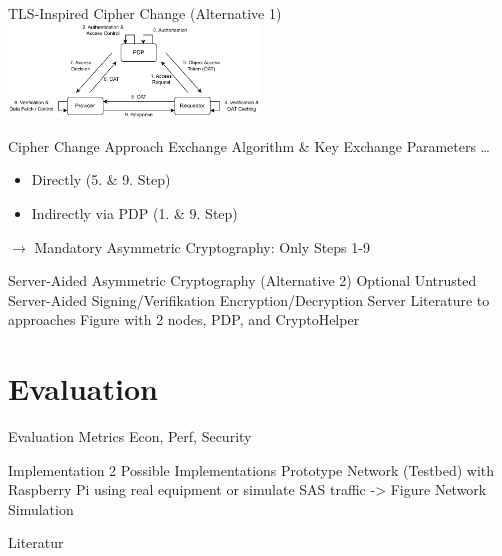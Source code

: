 \documentclass[en]{sdqbeamer}
\begin{document}
\begin{frame}{TLS-Inspired Cipher Change (Alternative 1)}
    \centering
    \includegraphics[width=0.5\textwidth]{./figures/access_control_request_delegation.drawio.pdf}
    \begin{greenblock}{Cipher Change Approach}
        Exchange Algorithm \& Key Exchange Parameters \dots
        \begin{itemize}
            \item Directly (5. \& 9. Step)
            \item Indirectly via PDP (1. \& 9. Step)
        \end{itemize}
        $\rightarrow$ Mandatory Asymmetric Cryptography: Only Steps 1-9
    \end{greenblock}
\end{frame}

\begin{frame}{Server-Aided Asymmetric Cryptography (Alternative 2)}
    Optional Untrusted Server-Aided Signing/Verifikation Encryption/Decryption Server
    Literature to approaches
    Figure with 2 nodes, PDP, and CryptoHelper
\end{frame}

\section{Evaluation}
\begin{frame}{Evaluation Metrics}
    Econ, Perf, Security
\end{frame}

\begin{frame}{Implementation}
    2 Possible Implementations
    Prototype Network (Testbed) with Raspberry Pi using real equipment or simulate SAS traffic -> Figure
    Network Simulation
\end{frame}

\appendix
\beginbackup

\begin{frame}{Literatur}
\printbibliography
\end{frame}

\backupend
\end{document}
